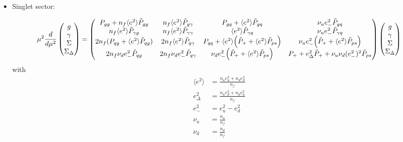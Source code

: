 \documentclass[a4paper,oneside]{article}
\begin{document}
\begin{itemize}
\item Singlet sector:

\begin{equation*}
\mu^2\frac{d}{d\mu^2}
\begin{pmatrix}
g \\
\gamma \\
\Sigma \\
\Sigma_\Delta
\end{pmatrix}
=
\begin{pmatrix}
 P_{gg}+n_f \langle e^2\rangle \tilde{P}_{gg} & n_f \langle e^2\rangle \tilde{P}_{g\gamma} & P_{gq} + \langle e^2\rangle \tilde{P}_{gq} & \nu_ue^2_-\tilde{P}_{gq} \\
 n_f \langle e^2\rangle \tilde{P}_{\gamma g} & n_f \langle e^2\rangle \tilde{P}_{\gamma \gamma} & \langle e^2\rangle \tilde{P}_{\gamma q} & \nu_ue^2_-\tilde{P}_{\gamma q} \\
 2n_f (P_{qg} +\langle e^2\rangle  \tilde{P}_{qg} )& 2 n_f \langle e^2\rangle  \tilde{P}_{q\gamma} & P_{qq}+ \langle e^2\rangle \Bigl(\tilde{P}_{+} + \langle e^2\rangle\tilde{P}_{ps}\Bigr)& \nu_ue^2_-\Bigl(\tilde{P}_{+}+ \langle e^2\rangle \tilde{P}_{ps} \Bigr)\\
 2n_f \nu_d e^2_-\tilde{P}_{qg} & 2n_f \nu_d e^2_-\tilde{P}_{q\gamma} & \nu_de^2_-\Bigl( \tilde{P}_{+} +  \langle e^2\rangle \tilde{P}_{ps} \Bigr)& P_+ +e_\Delta^2 \tilde{P}_{+} +\nu_u \nu_d (e^2_-)^2\tilde{P}_{ps}
\end{pmatrix}
\begin{pmatrix}
g \\
\gamma \\
\Sigma \\
\Sigma_\Delta
\end{pmatrix}
\end{equation*}
with
\begin{align*}
 \langle e^2\rangle&=\frac{n_u e_u^2+n_d e_d^2}{n_f} \\
e_\Delta^2&=\frac{n_u e_d^2+n_d e_u^2}{n_f} \\
e^2_-&= e_u^2 -e_d^2 \\
\nu_u &= \frac{n_u}{n_f}\\
\nu_d &= \frac{n_d}{n_f}
\end{align*}


\end{itemize}
\end{document}
